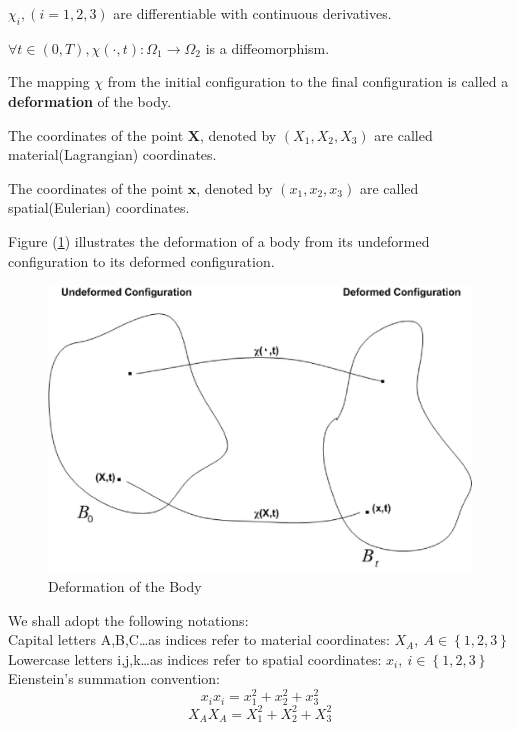 $\displaystyle{\chi_{i}, (i = 1,2,3)}$ are differentiable with continuous derivatives.

$\displaystyle{\forall t \in (0,T), \chi (\cdot,t) : \Omega_{1} \longrightarrow \Omega_{2}}$ is a diffeomorphism.

\begin{defi}
The mapping $\chi$ from the initial configuration to the final configuration is called a \textbf{deformation} of the body.
\end{defi}

The coordinates of the point $\textbf{X}$, denoted by $(X_1, X_2, X_3)$ are called material(Lagrangian) coordinates. 

The coordinates of the point $\textbf{x}$, denoted by $(x_1, x_2, x_3)$ are called spatial(Eulerian) coordinates.

Figure (\ref{DB}) illustrates the deformation of a body from its undeformed configuration to its deformed configuration.
\begin{figure}
\begin{center}
\caption{Deformation of the Body}
\label{DB}
\includegraphics[scale = .5]{config_gragh_marvin.eps}
\end{center}
\end{figure}

We shall adopt the following notations:\\
Capital letters A,B,C\ldots as indices refer to material coordinates: $ X_{A},\  A \in \left\{1,2,3\right\}$\\
Lowercase letters i,j,k\ldots as indices refer to spatial coordinates: $ x_{i},\  i \in \left\{1,2,3\right\}$\\
Eienstein's summation convention:\\
$$ x_{i}x_{i} = x_{1}^2 + x_{2}^2 + x_{3}^2 $$
$$ X_{A}X_{A} = X_{1}^2 + X_{2}^2 + X_{3}^2 $$

